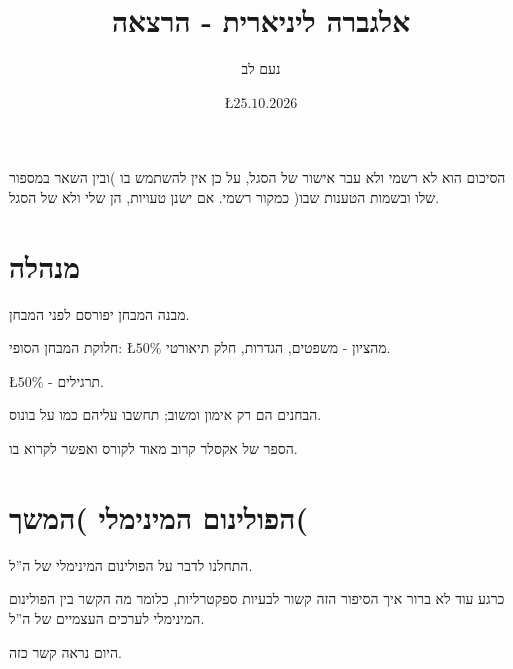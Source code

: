 \documentclass[english,hebrew]{article}
\begin{document}
\title{אלגברה ליניארית {\endL} - הרצאה {\endL}}
\author{נעם לב}
\date{\L{$25.10.2026$}}

\maketitle
\noindent{}
\begin{center}
הסיכום הוא לא רשמי ולא עבר אישור של הסגל, על כן אין להשתמש בו )ובין
השאר במספור שלו ובשמות הטענות שבו( כמקור רשמי. אם ישנן טעויות, הן
שלי ולא של הסגל.
\par\end{center}

\medskip{}

\tableofcontents{}

\newpage{}

\part{מנהלה}

מבנה המבחן יפורסם לפני המבחן. 

חלוקת המבחן הסופי: \L{$50\%$} מהציון - משפטים, הגדרות, חלק תיאורטי.

\L{$50\%$} - תרגילים.

הבחנים הם רק אימון ומשוב; תחשבו עליהם כמו על בונוס.

הספר של אקסלר קרוב מאוד לקורס ואפשר לקרוא בו.

\part{הפולינום המינימלי )המשך(}

התחלנו לדבר על הפולינום המינימלי של ה\textquotedblright ל.

כרגע עוד לא ברור איך הסיפור הזה קשור לבעיות ספקטרליות, כלומר מה הקשר
בין הפולינום המינימלי לערכים העצמיים של ה\textquotedblright ל.

היום נראה קשר כזה.
\end{document}
